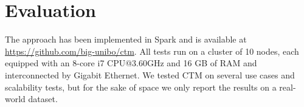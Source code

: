 \documentclass[
]{ceurart}
\renewcommand{\sf}[1]{\textsf{\textup{#1}}}
\newcommand{\mf}[1]{#1}
\begin{document}
\section{Evaluation}\label{sec:test}
The approach has been implemented in Spark and is available at \url{https://github.com/big-unibo/ctm}.
All tests run on a cluster of 10 nodes, each equipped with an 8-core i7 CPU@3.60GHz and 16 GB of RAM and interconnected by Gigabit Ethernet.
We tested CTM on several use cases and scalability tests, but for the sake of space we only report the results on a real-world dataset.%
\end{document}
